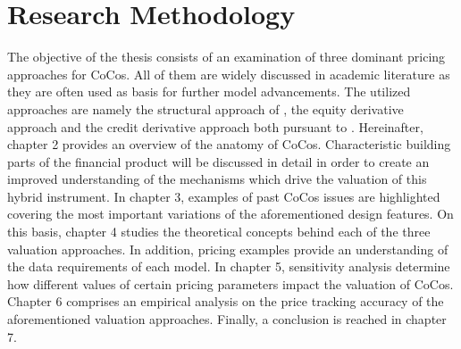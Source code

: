 \section{Research Methodology}
The objective of the thesis consists of an examination of three dominant pricing approaches for CoCos. All of them are widely discussed in academic literature as they are often used as basis for further model advancements. The utilized approaches are namely the structural approach of \citet{pennacchi2010structural}, the equity derivative approach and the credit derivative approach both pursuant to \citet{de2011pricing}. Hereinafter, chapter 2 provides an overview of the anatomy of CoCos. Characteristic building parts of the financial product will be discussed in detail in order to create an improved understanding of the mechanisms which drive the valuation of this hybrid instrument. In chapter 3, examples of past CoCos issues are highlighted covering the most important variations of the aforementioned design features. On this basis, chapter 4 studies the theoretical concepts behind each of the three valuation approaches. In addition, pricing examples provide an understanding of the data requirements of each model. In chapter 5, sensitivity analysis determine how different values of certain pricing parameters impact the valuation of CoCos. Chapter 6 comprises an empirical analysis on the price tracking accuracy of the aforementioned valuation approaches. Finally, a conclusion is reached in chapter 7.









